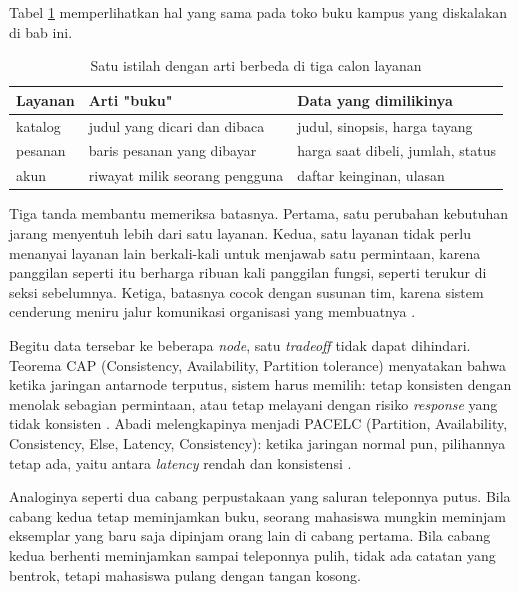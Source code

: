 Tabel \ref{tab:batas14} memperlihatkan hal yang sama pada toko buku kampus
yang diskalakan di bab ini.

\begin{table}[!htb]
  \centering
  \caption{Satu istilah dengan arti berbeda di tiga calon layanan}
  \label{tab:batas14}
  \begin{tabularx}{\textwidth}{lXX}
    \hline
    \textbf{Layanan} & \textbf{Arti "buku"} & \textbf{Data yang dimilikinya} \\
    \hline
    katalog & judul yang dicari dan dibaca & judul, sinopsis, harga tayang \\
    \hline
    pesanan & baris pesanan yang dibayar & harga saat dibeli, jumlah, status \\
    \hline
    akun & riwayat milik seorang pengguna & daftar keinginan, ulasan \\
    \hline
  \end{tabularx}
\end{table}

Tiga tanda membantu memeriksa batasnya. Pertama, satu perubahan kebutuhan
jarang menyentuh lebih dari satu layanan. Kedua, satu layanan tidak perlu
menanyai layanan lain berkali-kali untuk menjawab satu permintaan, karena
panggilan seperti itu berharga ribuan kali panggilan fungsi, seperti
terukur di seksi sebelumnya. Ketiga, batasnya cocok dengan susunan tim, karena
sistem cenderung meniru jalur komunikasi organisasi yang membuatnya
\cite{conway1968committees}.

Begitu data tersebar ke beberapa \textit{node}, satu \textit{tradeoff} tidak dapat
dihindari. Teorema CAP (Consistency, Availability, Partition tolerance)
menyatakan bahwa ketika jaringan antarnode terputus, sistem harus memilih:
tetap konsisten dengan menolak sebagian permintaan, atau tetap melayani
dengan risiko \textit{response} yang tidak konsisten \cite{gilbert2002cap}. Abadi
melengkapinya menjadi PACELC (Partition, Availability, Consistency, Else,
Latency, Consistency): ketika jaringan normal pun, pilihannya tetap ada,
yaitu antara \textit{latency} rendah dan konsistensi \cite{abadi2012pacelc}.

Analoginya seperti dua cabang perpustakaan yang saluran teleponnya putus.
Bila cabang kedua tetap meminjamkan buku, seorang mahasiswa mungkin meminjam
eksemplar yang baru saja dipinjam orang lain di cabang pertama. Bila cabang
kedua berhenti meminjamkan sampai teleponnya pulih, tidak ada catatan yang
bentrok, tetapi mahasiswa pulang dengan tangan kosong.


